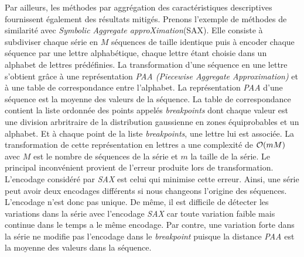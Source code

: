 Par ailleurs, les m\'ethodes par aggr\'egation des caract\'eristiques descriptives fournissent \'egalement des r\'esultats mitig\'es. Prenons l'exemple de m\'ethodes de similarit\'e avec {\em Symbolic Aggregate approXimation}(SAX). Elle consiste \`a subdiviser chaque s\'erie en $M$ s\'equences de taille identique puis \`a encoder chaque s\'equence par une lettre alphab\'etique, chaque lettre \'etant choisie dans un alphabet de lettres pr\'ed\'efinies. La transformation d'une s\'equence en une lettre s'obtient gr\^ace \`a une repr\'esentation {\em PAA (Piecewise Aggregate Approximation)} et \`a une table de correspondance entre l'alphabet. 
La repr\'esentation {\em PAA} \cite{paatheorique} d'une s\'equence est la moyenne des valeurs de la s\'equence. La table de correspondance contient la liste ordonn\'ee des points appel\'es {\em breakpoints} dont chaque valeur est une division arbritraire de la distribution gaussienne en zones \'equiprobables \cite{lin2003symbolic} et un alphabet. Et \`a chaque point de la liste {\em breakpoints}, une lettre lui est associ\'ee.
La transformation de cette repr\'esentation en lettres a une complexit\'e de  ${\cal O}(mM)$ \cite{lin2003symbolic} avec $M$ est le nombre de s\'equences de la s\'erie
et $m$ la taille de la s\'erie.
Le principal inconv\'enient provient de  l'erreur produite lors de transformation. L'encodage consid\'er\'e par {\em SAX} est celui qui minimise cette erreur.
 Ainsi, une s\'erie peut avoir deux encodages diff\'erents si nous changeons l'origine des s\'equences. L'encodage n'est donc pas unique.
De m\^eme, il est difficile de d\'etecter les variations dans la s\'erie avec l'encodage {\em SAX} car  toute variation faible mais continue dans le temps a le m\^eme encodage.  Par contre, une variation forte dans la s\'erie ne modifie pas l'encodage dans le {\em breakpoint} puisque la distance {\em PAA} est la moyenne des valeurs dans la s\'equence. 
\newline

